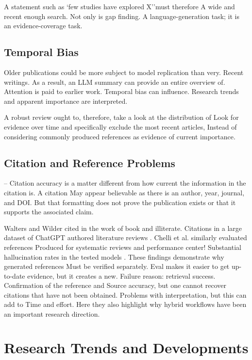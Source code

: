 \documentclass[acmsmall,screen]{acmart}
\begin{document}
A statement such as `few studies have explored X''must therefore
A wide and recent enough search. Not only is gap finding.
A language-generation task; it is an evidence-coverage task.

\subsection{Temporal Bias}

Older publications could be more subject to model replication than very.
Recent writings. As a result, an LLM summary can provide an entire overview of.
Attention is paid to earlier work. Temporal bias can influence.
Research trends and apparent importance are interpreted.

A robust review ought to, therefore, take a look at the distribution of
Look for evidence over time and specifically exclude the most recent articles,
Instead of considering commonly produced references as evidence of
current importance.

\subsection{Citation and Reference Problems}

-- Citation accuracy is a matter different from how current the information in the citation is. A citation
May appear believable as there is an author, year, journal, and DOI.
But that formatting does not prove the publication exists or that
it supports the associated claim.

Walters and Wilder cited in the work of book and illiterate.
Citations in a large dataset of ChatGPT authored literature reviews
\cite{walters2023}. Chelli et al. similarly evaluated references
Produced for systematic reviews and performance center!
Substantial hallucination rates in the tested models
\cite{chelli2024}. These findings demonstrate why generated references
Must be verified separately. Eval makes it easier to get up-to-date evidence, but it creates a new.
Failure reason: retrieval success. Confirmation of the reference and
Source accuracy, but one cannot recover citations that have not been obtained.
Problems with interpretation, but this can add to
Time and effort. Here they also highlight why hybrid workflows have been an
important research direction.

\section{Research Trends and Developments}
\end{document}
